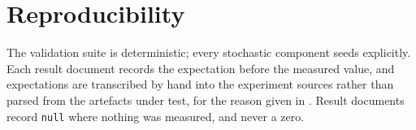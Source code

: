\documentclass[11pt,a4paper]{article}
\theoremstyle{plain}
\theoremstyle{definition}
\theoremstyle{remark}
\begin{document}
\section*{Reproducibility}

The validation suite is deterministic; every stochastic component seeds
explicitly. Each result document records the expectation before the measured
value, and expectations are transcribed by hand into the experiment sources
rather than parsed from the artefacts under test, for the reason given in
. Result documents record \texttt{null} where nothing was
measured, and never a zero.



\end{document}
